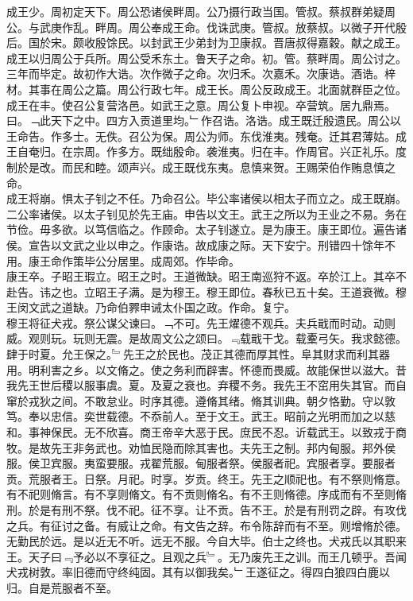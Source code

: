 \documentclass{zhvt-classic}
\begin{document}
\hspace*{2em}成王少。周初定天下。周公恐诸侯畔周。公乃摄行政当国。管叔。蔡叔群弟疑周公。与武庚作乱。畔周。周公奉成王命。伐诛武庚。管叔。放蔡叔。以微子开代殷后。国於宋。颇收殷馀民。以封武王少弟封为卫康叔。晋唐叔得嘉穀。献之成王。成王以归周公于兵所。周公受禾东土。鲁天子之命。初。管。蔡畔周。周公讨之。三年而毕定。故初作大诰。次作微子之命。次归禾。次嘉禾。次康诰。酒诰。梓材。其事在周公之篇。周公行政七年。成王长。周公反政成王。北面就群臣之位。\\
\hspace*{2em}成王在丰。使召公复营洛邑。如武王之意。周公复卜申视。卒营筑。居九鼎焉。曰。﹁此天下之中。四方入贡道里均。﹂作召诰。洛诰。成王既迁殷遗民。周公以王命告。作多士。无佚。召公为保。周公为师。东伐淮夷。残奄。迁其君薄姑。成王自奄归。在宗周。作多方。既绌殷命。袭淮夷。归在丰。作周官。兴正礼乐。度制於是改。而民和睦。颂声兴。成王既伐东夷。息慎来贺。王赐荣伯作贿息慎之命。\\
\hspace*{2em}成王将崩。惧太子钊之不任。乃命召公。毕公率诸侯以相太子而立之。成王既崩。二公率诸侯。以太子钊见於先王庙。申告以文王。武王之所以为王业之不易。务在节俭。毋多欲。以笃信临之。作顾命。太子钊遂立。是为康王。康王即位。遍告诸侯。宣告以文武之业以申之。作康诰。故成康之际。天下安宁。刑错四十馀年不用。康王命作策毕公分居里。成周郊。作毕命。\\
\hspace*{2em}康王卒。子昭王瑕立。昭王之时。王道微缺。昭王南巡狩不返。卒於江上。其卒不赴告。讳之也。立昭王子满。是为穆王。穆王即位。春秋已五十矣。王道衰微。穆王闵文武之道缺。乃命伯臩申诫太仆国之政。作命。复宁。\\
\hspace*{2em}穆王将征犬戎。祭公谋父谏曰。﹁不可。先王燿德不观兵。夫兵戢而时动。动则威。观则玩。玩则无震。是故周文公之颂曰。﹃载戢干戈。载櫜弓矢。我求懿德。肆于时夏。允王保之。﹄先王之於民也。茂正其德而厚其性。阜其财求而利其器用。明利害之乡。以文脩之。使之务利而辟害。怀德而畏威。故能保世以滋大。昔我先王世后稷以服事虞。夏。及夏之衰也。弃稷不务。我先王不窋用失其官。而自窜於戎狄之间。不敢怠业。时序其德。遵脩其绪。脩其训典。朝夕恪勤。守以敦笃。奉以忠信。奕世载德。不忝前人。至于文王。武王。昭前之光明而加之以慈和。事神保民。无不欣喜。商王帝辛大恶于民。庶民不忍。䜣载武王。以致戎于商牧。是故先王非务武也。劝恤民隐而除其害也。夫先王之制。邦内甸服。邦外侯服。侯卫宾服。夷蛮要服。戎翟荒服。甸服者祭。侯服者祀。宾服者享。要服者贡。荒服者王。日祭。月祀。时享。岁贡。终王。先王之顺祀也。有不祭则脩意。有不祀则脩言。有不享则脩文。有不贡则脩名。有不王则脩德。序成而有不至则脩刑。於是有刑不祭。伐不祀。征不享。让不贡。告不王。於是有刑罚之辟。有攻伐之兵。有征讨之备。有威让之命。有文告之辞。布令陈辞而有不至。则增脩於德。无勤民於远。是以近无不听。远无不服。今自大毕。伯士之终也。犬戎氏以其职来王。天子曰﹃予必以不享征之。且观之兵﹄。无乃废先王之训。而王几顿乎。吾闻犬戎树敦。率旧德而守终纯固。其有以御我矣。﹂王遂征之。得四白狼四白鹿以归。自是荒服者不至。\\
\end{document}

